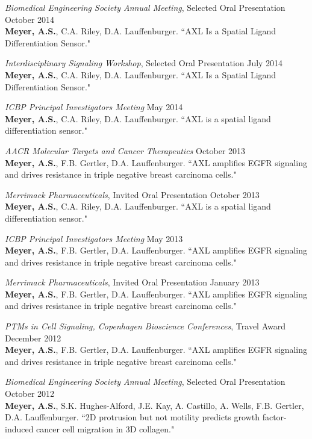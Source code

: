 \documentclass[11pt]{res}
\begin{document}
\begin{resume}
{\sl Biomedical Engineering Society Annual Meeting}, Selected Oral Presentation \hfill October 2014 \\
{\bf Meyer, A.S.}, C.A. Riley, D.A. Lauffenburger. ``AXL Is a Spatial Ligand Differentiation Sensor."

{\sl Interdisciplinary Signaling Workshop}, Selected Oral Presentation \hfill July 2014 \\
{\bf Meyer, A.S.}, C.A. Riley, D.A. Lauffenburger. ``AXL Is a Spatial Ligand Differentiation Sensor."

{\sl ICBP Principal Investigators Meeting} \hfill May 2014 \\
{\bf Meyer, A.S.}, C.A. Riley, D.A. Lauffenburger. ``AXL is a spatial ligand differentiation sensor."

{\sl AACR Molecular Targets and Cancer Therapeutics} \hfill October 2013 \\
{\bf Meyer, A.S.}, F.B. Gertler, D.A. Lauffenburger. ``AXL amplifies EGFR signaling and drives resistance in triple negative breast carcinoma cells."

{\sl Merrimack Pharmaceuticals}, Invited Oral Presentation \hfill October 2013 \\
{\bf Meyer, A.S.}, C.A. Riley, D.A. Lauffenburger. ``AXL is a spatial ligand differentiation sensor."

{\sl ICBP Principal Investigators Meeting} \hfill May 2013 \\
{\bf Meyer, A.S.}, F.B. Gertler, D.A. Lauffenburger. ``AXL amplifies EGFR signaling and drives resistance in triple negative breast carcinoma cells."

{\sl Merrimack Pharmaceuticals}, Invited Oral Presentation \hfill January 2013 \\
{\bf Meyer, A.S.}, F.B. Gertler, D.A. Lauffenburger. ``AXL amplifies EGFR signaling and drives resistance in triple negative breast carcinoma cells."

{\sl PTMs in Cell Signaling, Copenhagen Bioscience Conferences}, Travel Award \hfill December 2012 \\
{\bf Meyer, A.S.}, F.B. Gertler, D.A. Lauffenburger. ``AXL amplifies EGFR signaling and drives resistance in triple negative breast carcinoma cells."

{\sl Biomedical Engineering Society Annual Meeting}, Selected Oral Presentation \hfill October 2012 \\
{\bf Meyer, A.S.}, S.K. Hughes-Alford, J.E. Kay, A. Castillo, A. Wells, F.B. Gertler, D.A. Lauffenburger. ``2D protrusion but not motility predicts growth factor-induced cancer cell migration in 3D collagen."


\end{resume}
\end{document}
